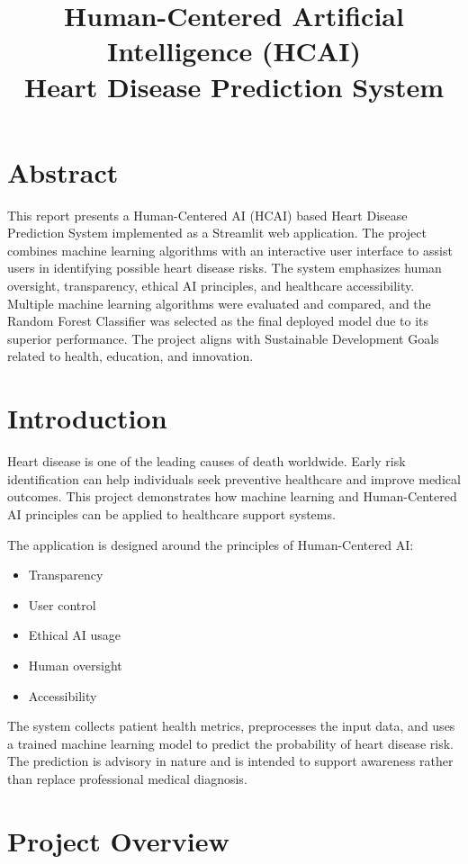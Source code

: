 \documentclass[12pt]{article}
\title{
\Huge \textbf{Human-Centered Artificial Intelligence (HCAI)} \\
\vspace{0.5cm}
\LARGE Heart Disease Prediction System
}
\author{}
\date{}
\begin{document}
\maketitle

\section*{Abstract}

This report presents a Human-Centered AI (HCAI) based Heart Disease Prediction System implemented as a Streamlit web application. The project combines machine learning algorithms with an interactive user interface to assist users in identifying possible heart disease risks. The system emphasizes human oversight, transparency, ethical AI principles, and healthcare accessibility. Multiple machine learning algorithms were evaluated and compared, and the Random Forest Classifier was selected as the final deployed model due to its superior performance. The project aligns with Sustainable Development Goals related to health, education, and innovation.

\section*{Introduction}

Heart disease is one of the leading causes of death worldwide. Early risk identification can help individuals seek preventive healthcare and improve medical outcomes. This project demonstrates how machine learning and Human-Centered AI principles can be applied to healthcare support systems.

The application is designed around the principles of Human-Centered AI:
\begin{itemize}
    \item Transparency
    \item User control
    \item Ethical AI usage
    \item Human oversight
    \item Accessibility
\end{itemize}

The system collects patient health metrics, preprocesses the input data, and uses a trained machine learning model to predict the probability of heart disease risk. The prediction is advisory in nature and is intended to support awareness rather than replace professional medical diagnosis.

\section*{Project Overview}
\end{document}
